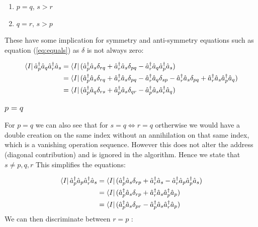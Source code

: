 \documentclass[12p]{article}
\begin{document}
\begin{enumerate}
  \item $p = q$, $s > r$
  \item $q = r$, $s > p$
\end{enumerate}
These have some implication for symmetry and anti-symmetry equations such as equation (\ref{eq:equals}) as $\delta$ is not always zero:


\begin{align}
   \bra{I}  \hat{a}^\dagger_p \hat{a}_q \hat{a}^\dagger_r \hat{a}_s & =   \bra{I} (\hat{a}^\dagger_p \hat{a}_s \delta_{rq} + \hat{a}^\dagger_r  \hat{a}_s \delta_{pq} - \hat{a}^\dagger_r \hat{a}_q \hat{a}^\dagger_p \hat{a}_s) \\
  & =   \bra{I} (\hat{a}^\dagger_p \hat{a}_s \delta_{rq} + \hat{a}^\dagger_r \hat{a}_s \delta_{pq} - \hat{a}^\dagger_r \hat{a}_q  \delta_{sp} - \hat{a}^\dagger_r \hat{a}_s \delta_{pq} + \hat{a}^\dagger_r \hat{a}_s \hat{a}^\dagger_p \hat{a}_q) \\
  & =   \bra{I} (\hat{a}^\dagger_p \hat{a}_q \delta_{rs} + \hat{a}^\dagger_p \hat{a}_s \delta_{qr} - \hat{a}^\dagger_p \hat{a}_s \hat{a}^\dagger_r \hat{a}_q)
\end{align}

\subsubsection{$p = q$} \label{p=q}
For $p = q$ we can also see that for $s = q \iff r = q$ ortherwise we would have a double creation on the same index without an annihilation on that same index, which is a vanishing operation sequence. However this does not alter the address (diagonal contribution) and is ignored in the algorithm. Hence we state that $ s \neq p, q, r $ This simplifies the equations:

\begin{align}
  \bra{I}  \hat{a}^\dagger_p \hat{a}_p \hat{a}^\dagger_r \hat{a}_s & =  \bra{I} (\hat{a}^\dagger_p \hat{a}_s \delta_{rp} + \hat{a}^\dagger_r  \hat{a}_s - \hat{a}^\dagger_r \hat{a}_p \hat{a}^\dagger_p \hat{a}_s) \\
  & =   \bra{I} (\hat{a}^\dagger_p \hat{a}_s \delta_{rp} + \hat{a}^\dagger_r \hat{a}_s \hat{a}^\dagger_p \hat{a}_p) \\
  & =   \bra{I} (\hat{a}^\dagger_p \hat{a}_s \delta_{pr} - \hat{a}^\dagger_p \hat{a}_s \hat{a}^\dagger_r \hat{a}_p)
\end{align}
We can then discriminate between $r = p$ :
\end{document}

